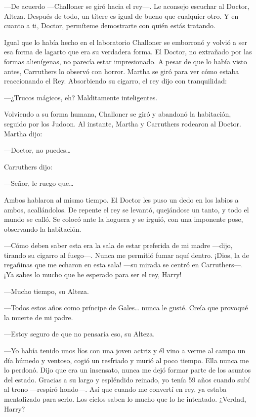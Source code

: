 ---De acuerdo ---Challoner se giró hacia el rey---. Le aconsejo escuchar
al Doctor, Alteza. Después de todo, un títere es igual de bueno que
cualquier otro. Y en cuanto a ti, Doctor, permíteme demostrarte con
quién estás tratando.

Igual que lo había hecho en el laboratorio Challoner se emborronó y
volvió a ser esa forma de lagarto que era su verdadera forma. El Doctor,
no extrañado por las formas alienígenas, no parecía estar impresionado.
A pesar de que lo había visto antes, Carruthers lo observó con horror.
Martha se giró para ver cómo estaba reaccionando el Rey. Absorbiendo su
cigarro, el rey dijo con tranquilidad:

---¿Trucos mágicos, eh? Malditamente inteligentes.

Volviendo a su forma humana, Challoner se giró y abandonó la habitación,
seguido por los Judoon. Al instante, Martha y Carruthers rodearon al
Doctor. Martha dijo:

---Doctor, no puedes\ldots{}

Carruthers dijo:

---Señor, le ruego que\ldots{}

Ambos hablaron al mismo tiempo. El Doctor les puso un dedo en los labios
a ambos, acallándolos. De repente el rey se levantó, quejándose un
tanto, y todo el mundo se calló. Se colocó ante la hoguera y se irguió,
con una imponente pose, observando la habitación.

---Cómo deben saber esta era la sala de estar preferida de mi madre
---dijo, tirando su cigarro al fuego---. Nunca me permitió fumar aquí
dentro. ¡Dios, la de regañinas que me echaron en esta sala! ---su mirada
se centró en Carruthers---. ¡Ya sabes lo mucho que he esperado para ser
el rey, Harry!

---Mucho tiempo, su Alteza.

---Todos estos años como príncipe de Gales\ldots{} nunca le gusté. Creía
que provoqué la muerte de mi padre.

---Estoy seguro de que no pensaría eso, su Alteza.

---Yo había tenido unos líos con una joven actriz y él vino a verme al
campo un día húmedo y ventoso, cogió un resfriado y murió al poco
tiempo. Ella nunca me lo perdonó. Dijo que era un insensato, nunca me
dejó formar parte de los asuntos del estado. Gracias a su largo y
espléndido reinado, yo tenía 59 años cuando subí al trono ---respiró
hondo---. Así que cuando me convertí en rey, ya estaba mentalizado para
serlo. Los cielos saben lo mucho que lo he intentado. ¿Verdad, Harry?

